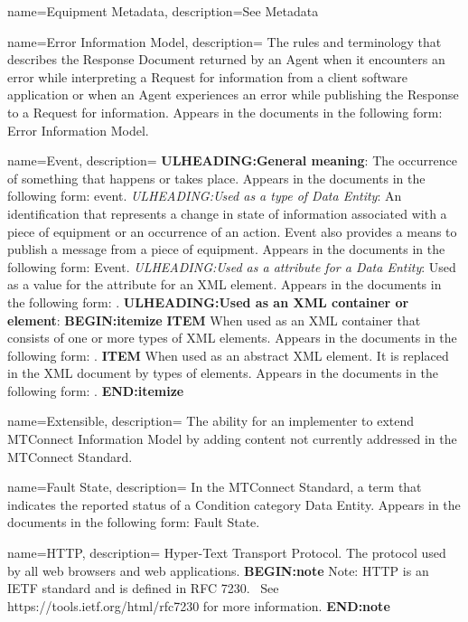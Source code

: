 {
    name={Equipment Metadata},
	description={See \gls{Metadata}}
}

{
    name={Error Information Model},
	description={
	The rules and terminology that describes the \gls{Response Document} returned by an \gls{Agent} when it encounters an error while interpreting a \gls{Request} for information from a client software application or when an \gls{Agent} experiences an error while publishing the \gls{Response} to a \gls{Request} for information.
	Appears in the documents in the following form: \gls{Error Information Model}.
}
}

{
    name={Event},
	description={
	\textbf{ULHEADING:General meaning}:
	The occurrence of something that happens or takes place.
	Appears in the documents in the following form: event.
	\textit{ULHEADING:Used as a type of \gls{Data Entity}}:
	An identification that represents a change in state of information associated with a piece of equipment or an occurrence of an action.  Event also provides a means to publish a message from a piece of equipment.
	Appears in the documents in the following form: \gls{Event}.
	\textit{ULHEADING:Used as a  attribute for a \gls{Data Entity}}:
	Used as a value for the  attribute for an XML  element.
	Appears in the documents in the following form: .
	\textbf{ULHEADING:Used as an XML container or element}:
    \textbf{BEGIN:itemize}
	\textbf{ITEM} When used as an XML container that consists of one or more types of  XML elements.
	Appears in the documents in the following form: .
	\textbf{ITEM} When used as an abstract XML element.  It is replaced in the XML document by types of  elements.
	Appears in the documents in the following form: .
    \textbf{END:itemize}
}
}

{
    name={Extensible},
	description={
	The ability for an implementer to extend \gls{MTConnect Information Model} by adding content not currently addressed in the MTConnect Standard.
}
}

{
    name={Fault State},
	description={
	In the MTConnect Standard, a term that indicates the reported status of a \gls{Condition} category \gls{Data Entity}.   
	Appears in the documents in the following form: \gls{Fault State}.
}
}

{
    name={HTTP},
	description={
	Hyper-Text Transport Protocol.  The protocol used by all web browsers and web applications.
    \textbf{BEGIN:note}
	Note:  HTTP is an IETF standard and is defined in RFC 7230. \ See https://tools.ietf.org/html/rfc7230 for more information.
	\textbf{END:note}
}
}

